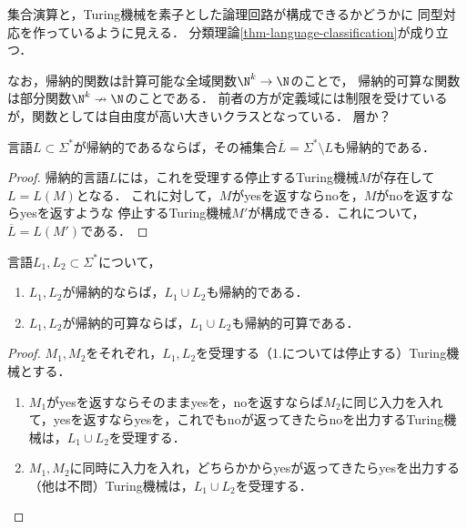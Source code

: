 \begin{tcolorbox}[colframe=ForestGreen, colback=ForestGreen!10!white, breakable]
    集合演算と，Turing機械を素子とした論理回路が構成できるかどうかに
    同型対応を作っているように見える．
    分類理論\ref{thm-language-classification}が成り立つ．

    なお，帰納的関数は計算可能な全域関数$\N^k\to\N$のことで，
    帰納的可算な関数は部分関数$\N^k\nrightarrow\N$のことである．
    前者の方が定義域には制限を受けているが，関数としては自由度が高い大きいクラスとなっている．
    層か？
\end{tcolorbox}

\begin{proposition}[補集合も帰納的]\label{prop-recursive-propagation-over-complement}
    言語$L\subset\Sigma^*$が帰納的であるならば，その補集合$\overline{L}=\Sigma^*\setminus L$も帰納的である．
\end{proposition}
\begin{proof}
    帰納的言語$L$には，これを受理する停止するTuring機械$M$が存在して$L=L(M)$となる．
    これに対して，$M$がyesを返すならnoを，$M$がnoを返すならyesを返すような
    停止するTuring機械$M'$が構成できる．これについて，$\overline{L}=L(M')$である．
\end{proof}

\begin{proposition}[合併も帰納的（可算）]
    言語$L_1,L_2\subset\Sigma^*$について，
    \begin{enumerate}
        \item $L_1,L_2$が帰納的ならば，$L_1\cup L_2$も帰納的である．
        \item $L_1,L_2$が帰納的可算ならば，$L_1\cup L_2$も帰納的可算である．
    \end{enumerate}
\end{proposition}
\begin{proof}
    $M_1,M_2$をそれぞれ，$L_1,L_2$を受理する（1.については停止する）Turing機械とする．
    \begin{enumerate}
        \item $M_1$がyesを返すならそのままyesを，noを返すならば$M_2$に同じ入力を入れて，yesを返すならyesを，これでもnoが返ってきたらnoを出力するTuring機械は，$L_1\cup L_2$を受理する．
        \item $M_1,M_2$に同時に入力を入れ，どちらかからyesが返ってきたらyesを出力する（他は不問）Turing機械は，$L_1\cup L_2$を受理する．
    \end{enumerate}
\end{proof}

